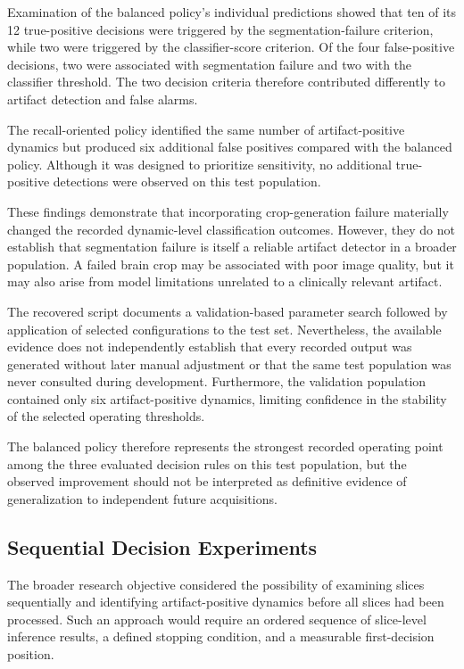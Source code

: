 Examination of the balanced policy's individual predictions showed that ten of its 12 true-positive decisions were triggered by the segmentation-failure criterion, while two were triggered by the classifier-score criterion. Of the four false-positive decisions, two were associated with segmentation failure and two with the classifier threshold. The two decision criteria therefore contributed differently to artifact detection and false alarms.

The recall-oriented policy identified the same number of artifact-positive dynamics but produced six additional false positives compared with the balanced policy. Although it was designed to prioritize sensitivity, no additional true-positive detections were observed on this test population.

These findings demonstrate that incorporating crop-generation failure materially changed the recorded dynamic-level classification outcomes. However, they do not establish that segmentation failure is itself a reliable artifact detector in a broader population. A failed brain crop may be associated with poor image quality, but it may also arise from model limitations unrelated to a clinically relevant artifact.

The recovered script documents a validation-based parameter search followed by application of selected configurations to the test set. Nevertheless, the available evidence does not independently establish that every recorded output was generated without later manual adjustment or that the same test population was never consulted during development. Furthermore, the validation population contained only six artifact-positive dynamics, limiting confidence in the stability of the selected operating thresholds.

The balanced policy therefore represents the strongest recorded operating point among the three evaluated decision rules on this test population, but the observed improvement should not be interpreted as definitive evidence of generalization to independent future acquisitions.

\subsection{Sequential Decision Experiments}
\label{subsec:results_sequential_status}

The broader research objective considered the possibility of examining slices sequentially and identifying artifact-positive dynamics before all slices had been processed. Such an approach would require an ordered sequence of slice-level inference results, a defined stopping condition, and a measurable first-decision position.

